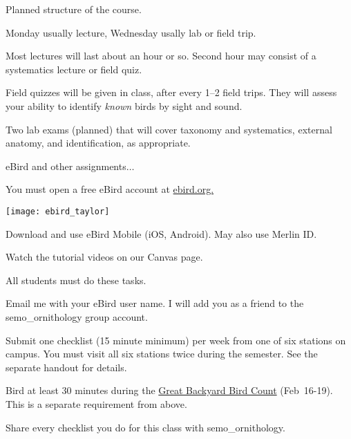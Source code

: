 \documentclass[t]{beamer}
\begin{document}
\begin{frame}[t]{Planned structure of the course.}

\vspace{-\baselineskip}

\hangpara Monday usually lecture, Wednesday usally lab or field trip.

\hangpara Most lectures will last about an hour or so. Second hour may consist of a systematics lecture or field quiz.

\hangpara Field quizzes will be given in class, after every 1–2 field trips. They will assess your ability to identify \textit{known} birds by sight and sound. 


\hangpara Two lab exams (planned) that will cover taxonomy and systematics, external anatomy, and identification, as appropriate.

\hangpara eBird and other assignments$\dots$

\end{frame}


{
\begin{frame}{You must open a free eBird account at \href{https://ebird.org}{ebird.org.}}
	\vspace{-\baselineskip}
	\begin{center}
		\texttt{[image: ebird\_taylor]}
	\end{center}
	
	Download and use eBird Mobile (iOS, Android). May also use Merlin ID.
	
	Watch the tutorial videos on our Canvas page.
%	
\end{frame}
}

{
\begin{frame}{All students must do these tasks.}

\vspace{-\baselineskip}

\hangpara Email me with your eBird user name. I will add you as a friend to the semo\_ornithology group account.

\hangpara Submit one checklist (15 minute minimum) per week from one of six stations on campus. You must visit all six stations twice during the semester. See the separate handout for details.

\hangpara Bird at least 30 minutes during the \href{https://www.birdcount.org/}{Great Backyard Bird Count} (Feb~16-19). This is a separate requirement from above.

\hangpara Share every checklist you do for this class with semo\_ornithology.

\hangpara \href{https://support.ebird.org/en/support/solutions/articles/48000795623-ebird-rules-and-best-practices}{}

\end{frame}
}
\end{document}
